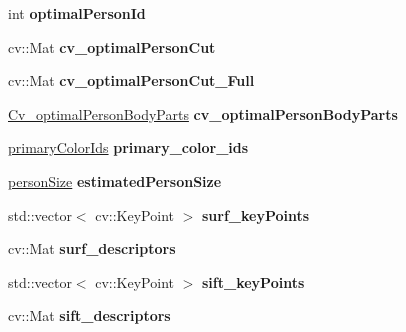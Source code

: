 \begin{DoxyCompactItemize}
\item 
\mbox{\label{structdto_1_1_track_ab4c84e18edb809426e57e4b68de614f6}} 
int {\bfseries optimal\+Person\+Id}
\item 
\mbox{\label{structdto_1_1_track_a317808d2b38e82b1de40b9d5348fc146}} 
cv\+::\+Mat {\bfseries cv\+\_\+optimal\+Person\+Cut}
\item 
\mbox{\label{structdto_1_1_track_a83c0879cd70045d4b98a945176a5a50e}} 
cv\+::\+Mat {\bfseries cv\+\_\+optimal\+Person\+Cut\+\_\+\+Full}
\item 
\mbox{\label{structdto_1_1_track_af76db48503b200395d2e3571ad59154e}} 
\mbox{\hyperlink{structdto_1_1_track_1_1_cv__optimal_person_body_parts}{Cv\+\_\+optimal\+Person\+Body\+Parts}} {\bfseries cv\+\_\+optimal\+Person\+Body\+Parts}
\item 
\mbox{\label{structdto_1_1_track_a9f9350fedf3164b45cbac90fca2bb584}} 
\mbox{\hyperlink{structdto_1_1_track_1_1primary_color_ids}{primary\+Color\+Ids}} {\bfseries primary\+\_\+color\+\_\+ids}
\item 
\mbox{\label{structdto_1_1_track_ae1174b37efdccf2e8d5598f9e8359540}} 
\mbox{\hyperlink{structdto_1_1_track_1_1person_size}{person\+Size}} {\bfseries estimated\+Person\+Size}
\item 
\mbox{\label{structdto_1_1_track_ab7835d7d9cb5fabc36d921765bf2ccef}} 
std\+::vector$<$ cv\+::\+Key\+Point $>$ {\bfseries surf\+\_\+key\+Points}
\item 
\mbox{\label{structdto_1_1_track_a1fdb63bf2082977b1853a4e0d09bf285}} 
cv\+::\+Mat {\bfseries surf\+\_\+descriptors}
\item 
\mbox{\label{structdto_1_1_track_a135e486deb0bd53318ddf31bae2ac13d}} 
std\+::vector$<$ cv\+::\+Key\+Point $>$ {\bfseries sift\+\_\+key\+Points}
\item 
\mbox{\label{structdto_1_1_track_a792fbb805358146f7d28fa93626d85c7}} 
cv\+::\+Mat {\bfseries sift\+\_\+descriptors}

\end{DoxyCompactItemize}
